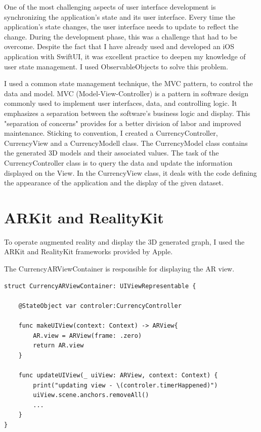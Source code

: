 \documentclass{report}
\begin{document}
One of the most challenging aspects of user interface development is synchronizing the application's state and its user interface. Every time the application's state changes, the user interface needs to update to reflect the change. During the development phase, this was a challenge that had to be overcome. Despite the fact that I have already used and developed an iOS application with SwiftUI, it was excellent practice to deepen my knowledge of user state management. I used ObservableObjects to solve this problem.

I used a common state management technique, the MVC pattern, to control the data and model. MVC (Model-View-Controller) is a pattern in software design commonly used to implement user interfaces, data, and controlling logic. It emphasizes a separation between the software's business logic and display. This "separation of concerns" provides for a better division of labor and improved maintenance. Sticking to convention, I created a CurrencyController, CurrencyView and a CurrencyModell class. The CurrencyModel class contains the generated 3D models and their associated values. The task of the CurrencyController class is to query the data and update the information displayed on the View. In the CurrencyView class, it deals with the code defining the appearance of the application and the display of the given dataset.


\section{ARKit and RealityKit}

To operate augmented reality and display the 3D generated graph, I used the ARKit and RealityKit frameworks provided by Apple.

The CurrencyARViewContainer is responsible for displaying the AR view.

\begin{lstlisting}
struct CurrencyARViewContainer: UIViewRepresentable {
    
    @StateObject var controler:CurrencyController
    
    func makeUIView(context: Context) -> ARView{
        AR.view = ARView(frame: .zero)
        return AR.view
    }
    
    func updateUIView(_ uiView: ARView, context: Context) {
        print("updating view - \(controler.timerHappened)")
        uiView.scene.anchors.removeAll()
        ...
    }
}
\end{lstlisting}
\end{document}
